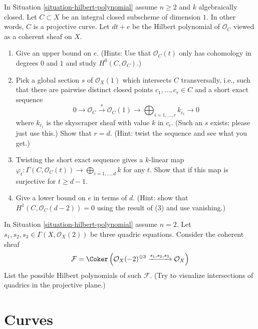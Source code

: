 \begin{exercise}
\label{exercise-bound-genus-in-degree}
In Situation \ref{situation-hilbert-polynomial} assume $n \geq 2$
and $k$ algebraically closed.
Let $C \subset X$ be an integral closed subscheme of dimension $1$.
In other words, $C$ is a projective curve.
Let $d t + e$ be the Hilbert polynomial of $\mathcal{O}_C$
viewed as a coherent sheaf on $X$.
\begin{enumerate}
\item Give an upper bound on $e$. (Hints: Use that
$\mathcal{O}_C(t)$ only has cohomology in degrees $0$ and $1$
and study $H^0(C, \mathcal{O}_C)$.)
\item Pick a global section $s$ of $\mathcal{O}_X(1)$
which intersects $C$ transversally, i.e., such that there
are pairwise distinct closed points $c_1, \ldots, c_r \in C$ and
a short exact sequence
$$
0 \to \mathcal{O}_C \xrightarrow{s} \mathcal{O}_C(1) \to
\bigoplus\nolimits_{i = 1, \ldots, r} k_{c_i} \to 0
$$
where $k_{c_i}$ is the skyscraper sheaf with value $k$ in $c_i$.
(Such an $s$ exists; please just use this.)
Show that $r = d$. (Hint: twist the sequence and see what you get.)
\item Twisting the short exact sequence gives a $k$-linear map
$\varphi_t : \Gamma(C, \mathcal{O}_C(t)) \to \bigoplus_{i = 1, \ldots, d} k$
for any $t$. Show that if this map is surjective for $t \geq d - 1$.
\item Give a lower bound on $e$ in terms of $d$. (Hint: show that
$H^1(C, \mathcal{O}_C(d - 2)) = 0$ using the result of (3) and use
vanishing.)
\end{enumerate}
\end{exercise}

\begin{exercise}
\label{exercise-three-quadrics-in-plane}
In Situation \ref{situation-hilbert-polynomial} assume $n = 2$.
Let $s_1, s_2, s_3 \in \Gamma(X, \mathcal{O}_X(2))$ be three
quadric equations. Consider the coherent sheaf
$$
\mathcal{F} = \Coker\left(\mathcal{O}_X(-2)^{\oplus 3}
\xrightarrow{s_1, s_2, s_3} \mathcal{O}_X\right)
$$
List the possible Hilbert polynomials of such $\mathcal{F}$.
(Try to visualize intersections of quadrics in the projective plane.)
\end{exercise}





\section{Curves}
\label{section-curves}


